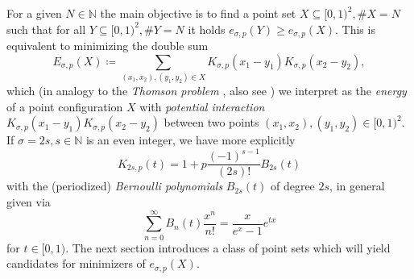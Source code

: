 \documentclass[]{interact}
\newcommand{\bbN}{\mathbb{N}}
\newcommand{\sbse}{\subseteq}
\theoremstyle{definition}
\numberwithin{table}{section} %
\numberwithin{figure}{section}
\begin{document}
For a given $N \in \bbN$ the main objective is to find a point set $X \sbse [0, 1)^2, \#X=N$ such that for all $Y \sbse [0, 1)^2, \#Y=N$ it holds $e_{\sigma, p}(Y) \geq e_{\sigma, p}(X)$. This is equivalent to minimizing the double sum
$$
E_{\sigma, p}(X) \coloneqq \sum_{(x_1, x_2), (y_1, y_2) \in X} K_{\sigma, p}(x_1-y_1) K_{\sigma, p}(x_2-y_2),
$$
which (in analogy to the \emph{Thomson problem} \cite{Tho04}, also see \cite{BHS19, CK07, HS04}) we interpret as the \emph{energy} of a point configuration $X$ with \emph{potential interaction} $K_{\sigma, p}(x_1-y_1) K_{\sigma, p}(x_2-y_2)$ between two points $(x_1, x_2), (y_1, y_2) \in [0, 1)^2$. If $\sigma = 2s, s \in \bbN$ is an even integer, we have more explicitly
$$
K_{2s, p}(t) = 1 + p \frac{(-1)^{s-1}}{(2s)!} B_{2s}(t)
$$
with the (periodized) \emph{Bernoulli polynomials} $B_{2s}(t)$ of degree $2s$, in general given via
$$
\sum_{n=0}^\infty B_n(t) \frac{x^n}{n!} = \frac{x}{e^x-1} e^{tx}
$$
for $t \in [0, 1)$. The next section introduces a class of point sets which will yield candidates for minimizers of $e_{\sigma, p}(X)$.
\end{document}
